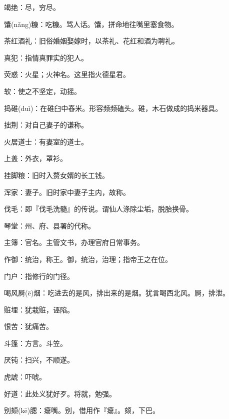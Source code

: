 \startbuffer[762]
竭绝：尽，穷尽。
\stopbuffer


\startbuffer[763]
馕(nǎng)糠：吃糠。骂人话。馕，拼命地往嘴里塞食物。
\stopbuffer


\startbuffer[764]
茶红酒礼：旧俗婚姻娶嫁时，以茶礼、花红和酒为聘礼。
\stopbuffer


\startbuffer[765]
真犯：指情真罪实的犯人。
\stopbuffer


\startbuffer[766]
荧惑：火星；火神名。这里指火德星君。
\stopbuffer


\startbuffer[767]
软：使之不坚定，动摇。
\stopbuffer


\startbuffer[768]
捣碓(duì)：在碓臼中舂米。形容频频磕头。碓，木石做成的捣米器具。
\stopbuffer


\startbuffer[769]
拙荆：对自己妻子的谦称。
\stopbuffer


\startbuffer[770]
火居道士：有妻室的道士。
\stopbuffer


\startbuffer[771]
上盖：外衣，罩衫。
\stopbuffer


\startbuffer[772]
挂脚粮：旧时入赘女婿的长工钱。
\stopbuffer


\startbuffer[773]
浑家：妻子。旧时家中妻子主内，故称。
\stopbuffer


\startbuffer[774]
伐毛：即『伐毛洗髓』的传说。谓仙人涤除尘垢，脱胎换骨。
\stopbuffer


\startbuffer[775]
琴堂：州、府、县署的代称。
\stopbuffer


\startbuffer[776]
主簿：官名。主管文书，办理官府日常事务。
\stopbuffer


\startbuffer[777]
作御：统治，称王。御，统治，治理；指帝王之在位。
\stopbuffer


\startbuffer[778]
门户：指修行的门径。
\stopbuffer


\startbuffer[779]
喝风屙(ē)烟：吃进去的是风，排出来的是烟。犹言喝西北风。屙，排泄。
\stopbuffer


\startbuffer[780]
赃埋：犹栽赃，诬陷。
\stopbuffer


\startbuffer[781]
恨苦：犹痛苦。
\stopbuffer


\startbuffer[782]
斗篷：方言。斗笠。
\stopbuffer


\startbuffer[783]
厌钝：扫兴，不顺遂。
\stopbuffer


\startbuffer[784]
虎諕：吓唬。
\stopbuffer


\startbuffer[785]
好道：此处义犹好歹。将就，勉强。
\stopbuffer


\startbuffer[786]
别颏(kē)腮：瘪嘴。别，借用作『瘪』。颏，下巴。
\stopbuffer


